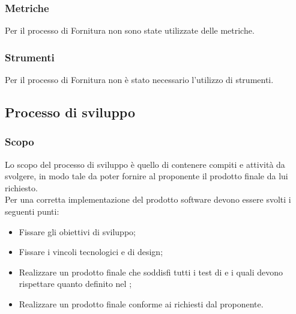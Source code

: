 

\subsubsection{Metriche} 
Per il processo di Fornitura non sono state utilizzate delle metriche.

\subsubsection{Strumenti} 
Per il processo di Fornitura non è stato necessario l'utilizzo di strumenti.

\subsection{Processo di sviluppo}
\subsubsection{Scopo}
Lo scopo del processo di sviluppo è quello di contenere compiti e attività da svolgere, in modo tale da poter fornire al proponente il prodotto finale da lui richiesto.\\
Per una corretta implementazione del prodotto software devono essere svolti i seguenti punti: 
\begin{itemize}
	\item Fissare gli obiettivi di sviluppo;
	\item Fissare i vincoli tecnologici e di design;
	\item Realizzare un prodotto finale che soddisfi tutti i test di  e  i quali devono rispettare quanto definito nel \PdQ{};
	\item Realizzare un prodotto finale conforme ai  richiesti dal proponente.
\end{itemize}
